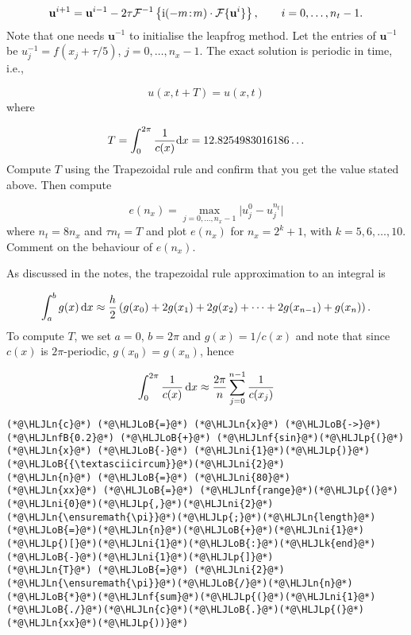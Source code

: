 \documentclass[12pt,a4paper]{article}
\newcommand{\HLJLk}[1]{\textcolor[RGB]{148,91,176}{\textbf{#1}}}
\newcommand{\HLJLn}[1]{#1}
\newcommand{\HLJLnf}[1]{\textcolor[RGB]{66,102,213}{#1}}
\newcommand{\HLJLnfB}[1]{\textcolor[RGB]{59,151,46}{#1}}
\newcommand{\HLJLni}[1]{\textcolor[RGB]{59,151,46}{#1}}
\newcommand{\HLJLoB}[1]{\textcolor[RGB]{102,102,102}{\textbf{#1}}}
\newcommand{\HLJLp}[1]{#1}
\begin{document}
\[
\mathbf{u}^{i+1} = \mathbf{u}^{i-1} - 2\tau \mathcal{F}^{-1}\left\lbrace {\rm i}(-m\!:\!m)\cdot\mathcal{F}\lbrace \mathbf{u}^{i} \rbrace\right\rbrace, \qquad i = 0, \ldots, n_t-1.
\]
Note that one needs $\mathbf{u}^{-1}$ to initialise the leapfrog method.  Let the entries of $\mathbf{u}^{-1}$ be $u^{-1}_j = f(x_j + \tau/5)$, $j = 0, \ldots, n_x-1$.  The exact solution is periodic in time, i.e.,

\[
   u(x,t+T) = u(x,t)
\]
where

\[
   T = \int_{0}^{2\pi}\frac{1}{c(x)}{\rm d}x = 12.8254983016186\ldots
\]
Compute $T$ using the Trapezoidal rule and confirm that you get the value stated above.  Then compute

\[
   e(n_x) = \max_{j = 0, \ldots, n_x-1} \vert u^{0}_j - u^{n_t}_{j} \vert
\]
where $n_t = 8n_x$ and $\tau n_t = T$  and plot $e(n_x)$ for $n_x = 2^k + 1$, with $k = 5, 6, \ldots, 10$.  Comment on the behaviour of $e(n_x)$.

As discussed in the notes, the trapezoidal rule approximation to an integral is

\[
\int_{a}^{b} g(x)\,{\rm d}x \approx \frac{h}{2}\left(g(x_0) + 2g(x_1) + 2g(x_2) + \cdots + 2g(x_{n-1}) + g(x_{n})    \right).
\]
To compute $T$, we set $a = 0$, $b = 2\pi$ and $g(x) = 1/c(x)$ and note that since $c(x)$ is $2\pi$-periodic, $g(x_0) = g(x_n)$, hence

\[
\int_0^{2\pi}\frac{1}{c(x)}\,{\rm d}x \approx \frac{2\pi}{n}\sum_{j=0}^{n-1}\frac{1}{c(x_j)}
\]

\begin{lstlisting}
(*@\HLJLn{c}@*) (*@\HLJLoB{=}@*) (*@\HLJLn{x}@*) (*@\HLJLoB{->}@*) (*@\HLJLnfB{0.2}@*) (*@\HLJLoB{+}@*) (*@\HLJLnf{sin}@*)(*@\HLJLp{(}@*)(*@\HLJLn{x}@*) (*@\HLJLoB{-}@*) (*@\HLJLni{1}@*)(*@\HLJLp{)}@*)(*@\HLJLoB{{\textasciicircum}}@*)(*@\HLJLni{2}@*)
(*@\HLJLn{n}@*) (*@\HLJLoB{=}@*) (*@\HLJLni{80}@*)
(*@\HLJLn{xx}@*) (*@\HLJLoB{=}@*) (*@\HLJLnf{range}@*)(*@\HLJLp{(}@*)(*@\HLJLni{0}@*)(*@\HLJLp{,}@*)(*@\HLJLni{2}@*)(*@\HLJLn{\ensuremath{\pi}}@*)(*@\HLJLp{;}@*)(*@\HLJLn{length}@*)(*@\HLJLoB{=}@*)(*@\HLJLn{n}@*)(*@\HLJLoB{+}@*)(*@\HLJLni{1}@*)(*@\HLJLp{)[}@*)(*@\HLJLni{1}@*)(*@\HLJLoB{:}@*)(*@\HLJLk{end}@*)(*@\HLJLoB{-}@*)(*@\HLJLni{1}@*)(*@\HLJLp{]}@*)
(*@\HLJLn{T}@*) (*@\HLJLoB{=}@*) (*@\HLJLni{2}@*)(*@\HLJLn{\ensuremath{\pi}}@*)(*@\HLJLoB{/}@*)(*@\HLJLn{n}@*)(*@\HLJLoB{*}@*)(*@\HLJLnf{sum}@*)(*@\HLJLp{(}@*)(*@\HLJLni{1}@*) (*@\HLJLoB{./}@*)(*@\HLJLn{c}@*)(*@\HLJLoB{.}@*)(*@\HLJLp{(}@*)(*@\HLJLn{xx}@*)(*@\HLJLp{))}@*)
\end{lstlisting}
\end{document}
